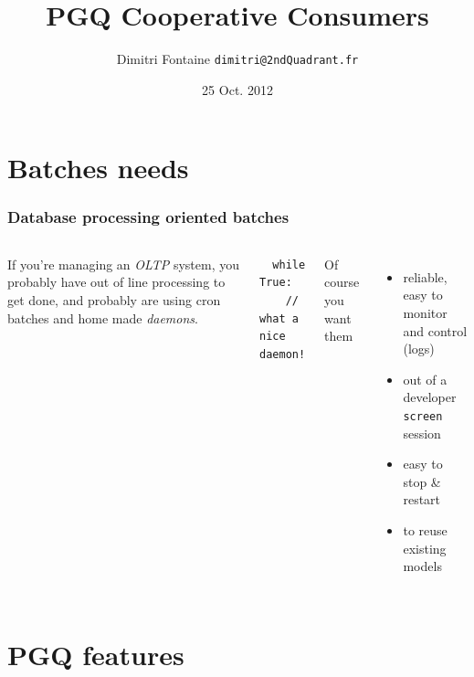 \documentclass{beamer}
\title{PGQ Cooperative Consumers}
\author{Dimitri Fontaine \newline\tiny{\texttt{dimitri@2ndQuadrant.fr}}}
\date{25 Oct. 2012}
\begin{document}
\frame{\titlepage}

\section{Batches needs}

\begin{frame}[fragile]
  \frametitle{Database processing oriented batches}

\begin{columns}[c]


If you're managing an \textit{OLTP} system, you probably have out of line
processing to get done, and probably are using cron batches and home made
\textit{daemons}.

\pause
\begin{example}
\begin{verbatim}
  while True: 
    // what a nice daemon!
\end{verbatim}
\end{example}

\pause
{} 
  Of course you want them 
  \begin{itemize}
   \item<3-> reliable, easy to monitor and control (logs)
   \item<4-> out of a developer \texttt{screen} session
   \item<5-> easy to stop \& restart
   \item<6-> to reuse existing models
  \end{itemize}

\end{columns}
\end{frame}

\section{PGQ features}
\end{document}
